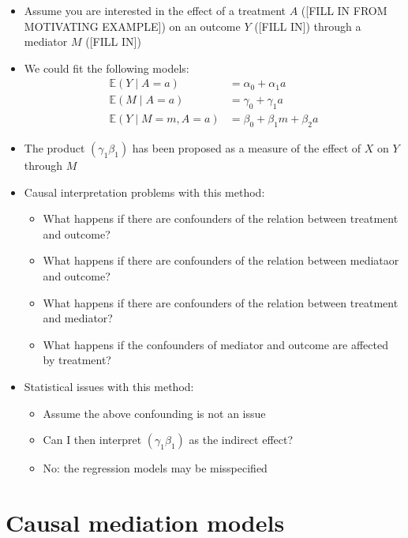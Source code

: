 \documentclass[
  12pt,
]{book}
\providecommand{\tightlist}{%
  \setlength{\itemsep}{0pt}\setlength{\parskip}{0pt}}
\theoremstyle{definition}
\theoremstyle{definition}
\theoremstyle{definition}
\newcommand{\E}{\mathbb{E}}
\newcommand{\1}{\mathbbm{1}}
\begin{document}
\begin{itemize}
\tightlist
\item
  Assume you are interested in the effect of a treatment \(A\) ({[}FILL IN FROM
  MOTIVATING EXAMPLE{]}) on an outcome \(Y\) ({[}FILL IN{]}) through a mediator \(M\)
  ({[}FILL IN{]})
\item
  We could fit the following models:
  \begin{align}
      \E(Y\mid A=a) & = \alpha_0 + \alpha_1 a\\
      \E(M\mid A=a) & = \gamma_0 + \gamma_1 a\\
      \E(Y\mid M=m, A=a) & = \beta_0 + \beta_1 m + \beta_2 a
    \end{align}
\item
  The product \((\gamma_1\beta_1)\) has been proposed as a measure of the effect
  of \(X\) on \(Y\) through \(M\)
\item
  Causal interpretation problems with this method:

  \begin{itemize}
  \tightlist
  \item
    What happens if there are confounders of the relation between treatment and outcome?
  \item
    What happens if there are confounders of the relation between mediataor and outcome?
  \item
    What happens if there are confounders of the relation between treatment and mediator?
  \item
    What happens if the confounders of mediator and outcome are affected by treatment?
  \end{itemize}
\item
  Statistical issues with this method:

  \begin{itemize}
  \tightlist
  \item
    Assume the above confounding is not an issue
  \item
    Can I then interpret \((\gamma_1\beta_1)\) as the indirect effect?
  \item
    No: the regression models may be misspecified
  \end{itemize}
\end{itemize}

\hypertarget{causal-mediation-models}{%
\section{Causal mediation models}\label{causal-mediation-models}}
\end{document}
